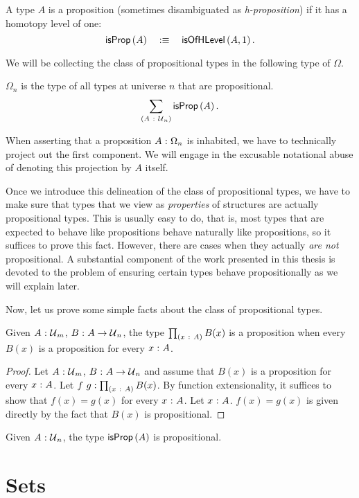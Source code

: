\begin{defn}[Proposition]
  A type $A$ is a proposition (sometimes disambiguated as \emph{h-proposition}) if it has
  a homotopy level of one:
  \begin{equation*}
    \mathsf{isProp}\left(A\right) \quad:\equiv\quad \mathsf{isOfHLevel}\left(A, 1\right).
  \end{equation*}
\end{defn}

We will be collecting the class of propositional types in the following type of $\Omega$.

\begin{defn}[$\Omega$]
  $\Omega_n$ is the type of all types at universe $n$ that are propositional.
  \begin{equation*}
    \sum_{(A~:~\mathcal{U}{}_n)} \mathsf{isProp}\left(A\right).
  \end{equation*}
\end{defn}

When asserting that a proposition $A\hspace{0.1mm}:\hspace{0.1mm}\Omega_n$ is inhabited, we have to technically
project out the first component. We will engage in the excusable notational abuse of
denoting this projection by $A$ itself.

Once we introduce this delineation of the class of propositional types, we have to make
sure that types that we view as \emph{properties} of structures are actually propositional
types. This is usually easy to do, that is, most types that are expected to behave like
propositions behave naturally like propositions, so it suffices to prove this fact.
However, there are cases when they actually \emph{are not} propositional. A substantial
component of the work presented in this thesis is devoted to the problem of ensuring
certain types behave propositionally as we will explain later.

Now, let us prove some simple facts about the class of propositional types.

\begin{prop}\label{thm:pi-prop}
  Given $A\hspace{0.1mm}:\hspace{0.1mm}\mathcal{U}{}_m$, $B\hspace{0.1mm}:\hspace{0.1mm}A \rightarrow \mathcal{U}{}_n$, the type $\prod_{(x~:~A)} B(x)$
  is a proposition when every $B(x)$ is a proposition for every $x\hspace{0.1mm}:\hspace{0.1mm}A$.
\end{prop}
\begin{proof}
  Let $A\hspace{0.1mm}:\hspace{0.1mm}\mathcal{U}{}_m$, $B\hspace{0.1mm}:\hspace{0.1mm}A \rightarrow \mathcal{U}{}_n$ and assume that $B(x)$ is a
  proposition for every $x\hspace{0.1mm}:\hspace{0.1mm}A$. Let $f~g:\prod_{(x~:~A)} B(x)$. By
  function extensionality, it suffices to show that $f(x) = g(x)$ for every
  $x\hspace{0.1mm}:\hspace{0.1mm}A$. Let $x\hspace{0.1mm}:\hspace{0.1mm}A$. $f(x) = g(x)$ is given directly by the fact that
  $B(x)$ is propositional.
\end{proof}

\begin{prop}
  Given $A\hspace{0.1mm}:\hspace{0.1mm}\mathcal{U}{}_n$, the type $\mathsf{isProp}\left(A\right)$ is propositional.
\end{prop}

\section{Sets}
